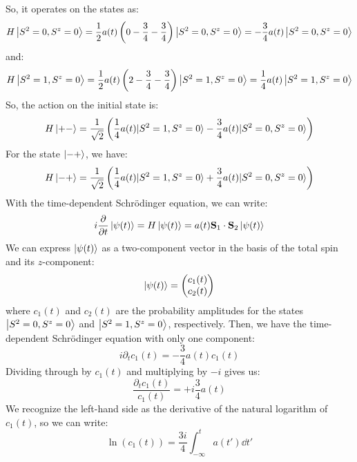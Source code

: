 \documentclass[12pt]{article}
\begin{document}
So, it operates on the states as:
\begin{equation}
  H\ket{S^2 = 0, S^z = 0} = \frac{1}{2}a(t)\left(0 - \frac{3}{4} - \frac{3}{4}\right)\ket{S^2 = 0, S^z = 0} = -\frac{3}{4}a(t)\ket{S^2 = 0, S^z = 0}
\end{equation}
and:
\begin{equation}
  H\ket{S^2 = 1, S^z = 0} = \frac{1}{2}a(t)\left(2 - \frac{3}{4} - \frac{3}{4}\right)\ket{S^2 = 1, S^z = 0} = \frac{1}{4}a(t)\ket{S^2 = 1, S^z = 0}
\end{equation}
So, the action on the initial state is:
\begin{equation}
  H\ket{+-} = \frac{1}{\sqrt{2}}\left(\frac{1}{4}a(t)|S^2 = 1, S^z = 0\rangle - \frac{3}{4}a(t)|S^2 = 0, S^z = 0\rangle\right)
\end{equation}
For the state $\ket{-+}$, we have:
\begin{equation}
  H\ket{-+} = \frac{1}{\sqrt{2}}\left(\frac{1}{4}a(t)|S^2 = 1, S^z = 0\rangle + \frac{3}{4}a(t)|S^2 = 0, S^z = 0\rangle\right)
\end{equation}
With the time-dependent Schrödinger equation, we can write:
\begin{equation}
  i \pdv{t} \ket{\psi (t)} = H\ket{\psi (t)} = a(t) \mathbf{S}_1 \cdot \mathbf{S}_2 \ket{\psi (t)}
\end{equation}
We can express $\ket{\psi (t)}$ as a two-component vector in the basis of the total spin and its $z$-component:
\begin{equation}
  \ket{\psi (t)} = \begin{pmatrix} c_1(t) \\ c_2(t) \end{pmatrix}
\end{equation}
where $c_1(t)$ and $c_2(t)$ are the probability amplitudes for the states $\ket{S^2 = 0, S^z = 0}$ and $\ket{S^2 = 1, S^z = 0}$, respectively. Then, we have the time-dependent Schrödinger equation with only one component:
\begin{equation}
  i \partial_{t} c_1(t) = -\frac{3}{4}a(t)c_1(t)
\end{equation}
Dividing through by $c_1(t)$ and multiplying by $-i$ gives us:
\begin{equation}
  \frac{\partial_{t} c_1(t)}{c_1(t)} = +i\frac{3}{4} a(t)
\end{equation}
We recognize the left-hand side as the derivative of the natural logarithm of $c_1(t)$, so we can write:
\begin{equation}
  \ln(c_1(t)) = \frac{3i}{4}\int_{-\infty}^{t} a(t')\dd{t'}
\end{equation}
\end{document}
